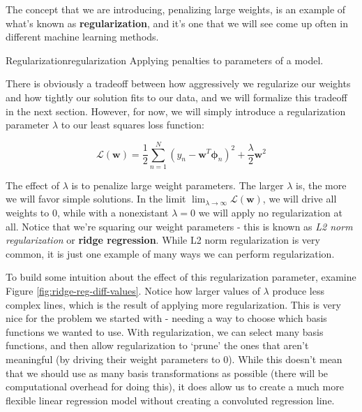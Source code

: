 The concept that we are introducing, penalizing large weights, is an example of what's known as \textbf{regularization}, and it's one that we will see come up often in different machine learning methods.

\begin{definition}{Regularization}{regularization}
    Applying penalties to parameters of a model.
\end{definition}

There is obviously a tradeoff between how aggressively we regularize our weights and how tightly our solution fits to our data, and we will formalize this tradeoff in the next section. However, for now, we will simply introduce a regularization parameter $\lambda$ to our least squares loss function:

\begin{equation} \label{least-squares-loss-fn-w-regularization}
    \mathcal{L}(\textbf{w}) = \frac{1}{2} \sum_{n=1}^{N} (y_{n} - \textbf{w}^{T}\boldsymbol{\phi}_{n})^2 + \frac{\lambda}{2}\textbf{w}^{2}
\end{equation}

The effect of $\lambda$ is to penalize large weight parameters. The larger $\lambda$ is, the more we will favor simple solutions. In the limit $\lim_{\lambda\to\infty} \mathcal{L}(\textbf{w})$, we will drive all weights to 0, while with a nonexistant $\lambda = 0$ we will apply no regularization at all. Notice that we're squaring our weight parameters - this is known as \textit{L2 norm regularization} or \textbf{ridge regression}. While L2 norm regularization is very common, it is just one example of many ways we can perform regularization.

To build some intuition about the effect of this regularization parameter, examine Figure \ref{fig:ridge-reg-diff-values}. Notice how larger values of $\lambda$ produce less complex lines, which is the result of applying more regularization. This is very nice for the problem we started with - needing a way to choose which basis functions we wanted to use. With regularization, we can select many basis functions, and then allow regularization to `prune' the ones that aren't meaningful (by driving their weight parameters to 0). While this doesn't mean that we should use as many basis transformations as possible (there will be computational overhead for doing this), it does allow us to create a much more flexible linear regression model without creating a convoluted regression line.

